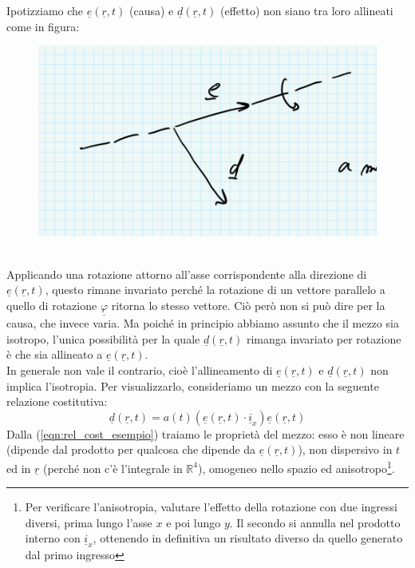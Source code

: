 \documentclass{book}
\begin{document}
            Ipotizziamo che $\underline{e}(\underline{r},t)$ (causa) e $\underline{d}(\underline{r},t)$ (effetto) non siano tra loro allineati come in figura:
            \begin{figure}[h!]
                \centering
                \includegraphics[width=0.5\linewidth]{img//Chapter_one/chaptOneIsotropia.png}
                \label{fig:isotropia}
                \caption{}
            \end{figure} \\
            Applicando una rotazione attorno all'asse corrispondente alla direzione di $\underline{e}(\underline{r},t)$, questo rimane invariato perché la rotazione di un vettore parallelo a quello di rotazione $\underline{\varphi}$ ritorna lo stesso vettore. Ciò però non si può dire per la causa, che invece varia. Ma poiché in principio abbiamo assunto che il mezzo sia isotropo, l'unica possibilità per la quale $\underline{d}(\underline{r},t)$ rimanga invariato per rotazione è che sia allineato a $\underline{e}(\underline{r},t)$. \\
            In generale non vale il contrario, cioè l'allineamento di $\underline{e}(\underline{r},t)$ e $\underline{d}(\underline{r},t)$ non implica l'isotropia. Per visualizzarlo, consideriamo un mezzo con la seguente relazione costitutiva:
            \begin{equation}
                \label{eqn:rel_cost_esempio}
                \underline{d}(\underline{r},t) = a(t) (\underline{e}(\underline{r},t) \cdot \underline{i}_{x})\underline{e}(\underline{r},t)
            \end{equation}
            Dalla (\ref{eqn:rel_cost_esempio}) traiamo le proprietà del mezzo: esso è non lineare (dipende dal prodotto per qualcosa che dipende da $\underline{e}(\underline{r},t)$), non dispersivo in $t$ ed in $\underline{r}$ (perché non c'è l'integrale in $\mathbb{R} ^{4}$), omogeneo nello spazio ed anisotropo\footnote{Per verificare l'anisotropia, valutare l'effetto della rotazione con due ingressi diversi, prima lungo l'asse $x$ e poi lungo $y$. Il secondo si annulla nel prodotto interno con $\underline{i}_{x}$, ottenendo in definitiva un risultato diverso da quello generato dal primo ingresso}.
\end{document}
